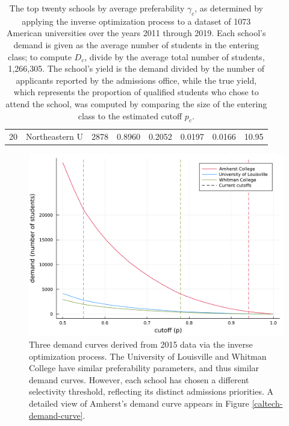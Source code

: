 \documentclass[12pt]{article}
\numberwithin{equation}{subsection}
\theoremstyle{definition}
\begin{document}
\begin{table}[]
\begin{tabular}{r|lrrrrrr}
20            & Northeastern U                        & 2878            & 0.8960                                                          & 0.2052         & 0.0197              & 0.0166                                                                   & 10.95                                                                   
\end{tabular}
\normalsize \caption{\label{tab:US-inverse-optimization}
The top twenty schools by average preferability $\gamma_c$, as determined by applying the inverse optimization process to a dataset of 1073 American universities over the years 2011 through 2019. Each school's demand is given as the average number of students in the entering class; to compute $D_c$, divide by the average total number of students, 1,266,305. The school's yield is the demand divided by the number of applicants reported by the admissions office, while the true yield, which represents the proportion of qualified students who chose to attend the school, was computed by comparing the size of the entering class to the estimated cutoff $p_c$.}
\end{table}





\begin{figure}
\begin{center}\includegraphics[width=\linewidth, ]{singlescoreplots/three-demand-curves.pdf}\end{center}
\captionsetup{singlelinecheck=off}
    \caption[.]{Three demand curves derived from 2015 data via the inverse optimization process. The University of Louisville and Whitman College have similar preferability parameters, and thus similar demand curves. However, each school has chosen a different selectivity threshold, reflecting its distinct admissions priorities. A detailed view of Amherst's demand curve appears in Figure \ref{caltech-demand-curve}.}
\label{three-demand-curves}
\end{figure}
\end{document}

